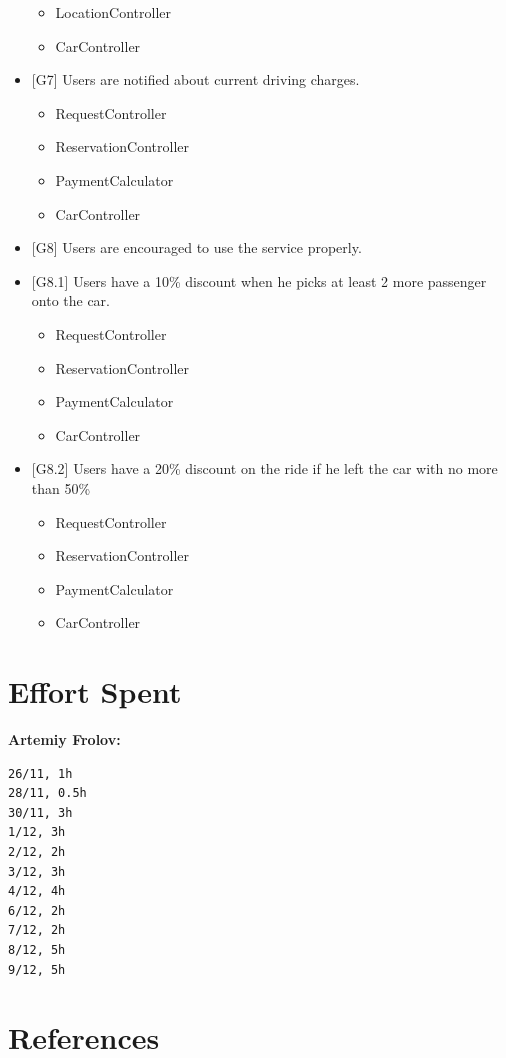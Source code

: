 \documentclass[12pt, letterpaper]{article}
\begin{document}
\begin{itemize}
\begin{itemize}
		\item LocationController
		\item CarController
	\end{itemize}
	\item {[G7]} Users are notified about current driving charges.
	\begin{itemize}
		\item RequestController
		\item ReservationController
		\item PaymentCalculator
		\item CarController
	\end{itemize}
	\item {[G8]} Users are encouraged to use the service properly.
	\item {[G8.1]} Users have a 10\% discount when he picks at least 2 more passenger onto the car.
	\begin{itemize}
		\item RequestController
		\item ReservationController
		\item PaymentCalculator
		\item CarController
	\end{itemize}
	\item {[G8.2]} Users have a 20\% discount on the ride if he left the car with no more than 50\%
	\begin{itemize}
		\item RequestController
		\item ReservationController
		\item PaymentCalculator
		\item CarController
	\end{itemize}
\end{itemize}

\newpage
\section {Effort Spent} 
\textbf{Artemiy Frolov:}
\begin{verbatim}
26/11, 1h
28/11, 0.5h
30/11, 3h
1/12, 3h
2/12, 2h
3/12, 3h
4/12, 4h
6/12, 2h
7/12, 2h
8/12, 5h
9/12, 5h
\end{verbatim} 

\newpage
\section{References}
\end{document}
